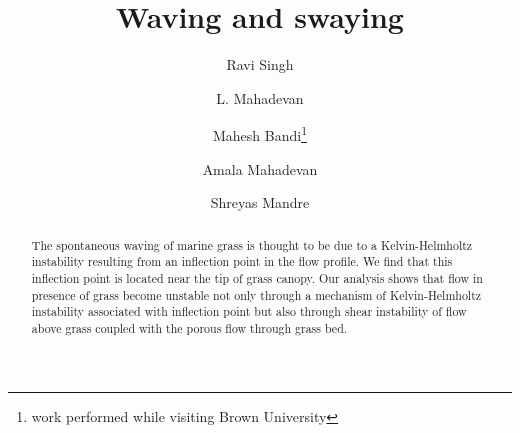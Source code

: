 \documentclass[aps,prl,twocolumn,showpacs,superscriptaddress,groupedaddress,10pt]{revtex4-1}  %
\begin{document}
\title{Waving and swaying}
\author{Ravi Singh}
\author{L. Mahadevan}
\author{Mahesh Bandi\footnote{work performed while visiting Brown University}}
\author{Amala Mahadevan}
\author{Shreyas Mandre}

\begin{abstract}


The spontaneous waving of marine grass is thought to be due to a Kelvin-Helmholtz instability resulting from an inflection point in the flow profile. We find that this inflection point
is located near the tip of grass canopy. Our analysis shows that flow in presence of grass become unstable not only through a mechanism of Kelvin-Helmholtz instability associated with 
inflection point but also through shear instability of flow above grass coupled with the porous flow through grass bed.
\end{abstract}
\maketitle
\end{document}
